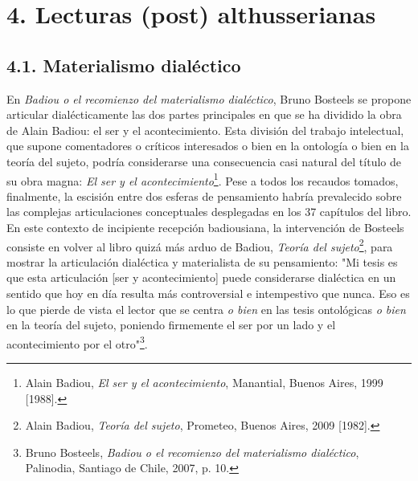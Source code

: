 \section{4. Lecturas (post) althusserianas}

\subsection{4.1. Materialismo dialéctico}

En \emph{Badiou o el recomienzo del materialismo dialéctico}, Bruno
Bosteels se propone articular dialécticamente las dos partes principales
en que se ha dividido la obra de Alain Badiou: el ser y el
acontecimiento. Esta división del trabajo intelectual, que supone
comentadores o críticos interesados o bien en la ontología o bien en la
teoría del sujeto, podría considerarse una consecuencia casi natural del
título de su obra magna: \emph{El ser y el acontecimiento}\footnote{Alain
  Badiou, \emph{El ser y el acontecimiento}, Manantial, Buenos Aires,
  1999 {[}1988{]}.}. Pese a todos los recaudos tomados, finalmente, la
escisión entre dos esferas de pensamiento habría prevalecido sobre las
complejas articulaciones conceptuales desplegadas en los 37 capítulos
del libro. En este contexto de incipiente recepción badiousiana, la
intervención de Bosteels consiste en volver al libro quizá más arduo de
Badiou, \emph{Teoría del sujeto}\footnote{Alain Badiou, \emph{Teoría del
  sujeto}, Prometeo, Buenos Aires, 2009 {[}1982{]}.}, para mostrar la
articulación dialéctica y materialista de su pensamiento: "Mi tesis es
que esta articulación {[}ser y acontecimiento{]} puede considerarse
dialéctica en un sentido que hoy en día resulta más controversial e
intempestivo que nunca. Eso es lo que pierde de vista el lector que se
centra \emph{o bien} en las tesis ontológicas \emph{o bien} en la teoría
del sujeto, poniendo firmemente el ser por un lado y el acontecimiento
por el otro"\footnote{Bruno Bosteels, \emph{Badiou o el recomienzo del
  materialismo dialéctico}, Palinodia, Santiago de Chile, 2007, p. 10.}.

